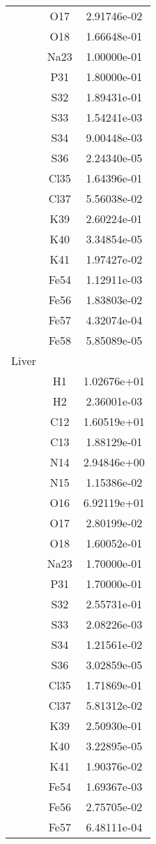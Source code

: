 \begin{centering}
\begin{longtable}{l c c}
& O17 & 2.91746e-02 \\ 
& O18 & 1.66648e-01 \\ 
& Na23 & 1.00000e-01 \\ 
& P31 & 1.80000e-01 \\ 
& S32 & 1.89431e-01 \\ 
& S33 & 1.54241e-03 \\ 
& S34 & 9.00448e-03 \\ 
& S36 & 2.24340e-05 \\ 
& Cl35 & 1.64396e-01 \\ 
& Cl37 & 5.56038e-02 \\ 
& K39 & 2.60224e-01 \\ 
& K40 & 3.34854e-05 \\ 
& K41 & 1.97427e-02 \\ 
& Fe54 & 1.12911e-03 \\ 
& Fe56 & 1.83803e-02 \\ 
& Fe57 & 4.32074e-04 \\ 
& Fe58 & 5.85089e-05 \\ 
\hline
Liver & & \\
\hline
& H1 & 1.02676e+01 \\ 
& H2 & 2.36001e-03 \\ 
& C12 & 1.60519e+01 \\ 
& C13 & 1.88129e-01 \\ 
& N14 & 2.94846e+00 \\ 
& N15 & 1.15386e-02 \\ 
& O16 & 6.92119e+01 \\ 
& O17 & 2.80199e-02 \\ 
& O18 & 1.60052e-01 \\ 
& Na23 & 1.70000e-01 \\ 
& P31 & 1.70000e-01 \\ 
& S32 & 2.55731e-01 \\ 
& S33 & 2.08226e-03 \\ 
& S34 & 1.21561e-02 \\ 
& S36 & 3.02859e-05 \\ 
& Cl35 & 1.71869e-01 \\ 
& Cl37 & 5.81312e-02 \\ 
& K39 & 2.50930e-01 \\ 
& K40 & 3.22895e-05 \\ 
& K41 & 1.90376e-02 \\ 
& Fe54 & 1.69367e-03 \\ 
& Fe56 & 2.75705e-02 \\ 
& Fe57 & 6.48111e-04 \\ 

\end{longtable}
\end{centering}
